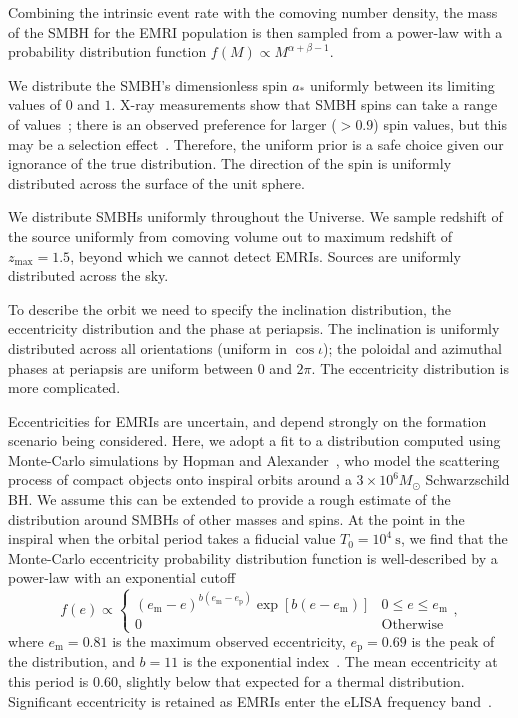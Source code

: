 \documentclass[aps,prd,amsfonts,amssymb,amsmath,nofootinbib,showpacs,superscriptaddress,twocolumn,floatfix]{revtex4-1}
\newcommand{\sub}[1]{\ensuremath{_\mathrm{#1}}}
\begin{document}
Combining the intrinsic event rate with the comoving number density, the mass of the SMBH for the EMRI population is then sampled from a power-law with a probability distribution function $f(M) \propto M^{\alpha+\beta-1}$.

We distribute the SMBH's dimensionless spin $a_\ast$ uniformly between its limiting values of $0$ and $1$. X-ray measurements show that SMBH spins can take a range of values~\cite{Reynolds2013a,Patrick2012,Walton2013,BerryThesis2013}; there is an observed preference for larger ($> 0.9$) spin values, but this may be a selection effect~\cite{Brenneman2011}. Therefore, the uniform prior is a safe choice given our ignorance of the true distribution. The direction of the spin is uniformly distributed across the surface of the unit sphere.

We distribute SMBHs uniformly throughout the Universe. We sample redshift of the source uniformly from comoving volume out to maximum redshift of $z\sub{max} = 1.5$, beyond which we cannot detect EMRIs. Sources are uniformly distributed across the sky. 

To describe the orbit we need to specify the inclination distribution, the eccentricity distribution and the phase at periapsis. The inclination is uniformly distributed across all orientations (uniform in $\cos \iota$); the poloidal and azimuthal phases at periapsis are uniform between $0$ and $2\pi$. The eccentricity distribution is more complicated.

Eccentricities for EMRIs are uncertain, and depend strongly on the formation scenario being considered. Here, we adopt a fit to a distribution computed using Monte-Carlo simulations by Hopman and Alexander~\cite{Hopman2005}, who model the scattering process of compact objects onto inspiral orbits around a $3 \times 10^6 M_\odot$ Schwarzschild BH. We assume this can be extended to provide a rough estimate of the distribution around SMBHs of other masses and spins. At the point in the inspiral when the orbital period takes a fiducial value $T_0 = 10^4~\mathrm{s}$, we find that the Monte-Carlo eccentricity probability distribution function is well-described by a power-law with an exponential cutoff
\begin{equation}
\label{eq:EMRI-e-distribution}
f(e) \propto 
	\begin{cases}
		\left(e\sub{m}-e\right)^{b(e\sub{m}-e\sub{p})} \exp\left[b(e-e\sub{m})\right] & 0 \leq e \leq e\sub{m}\\
		0 & \mathrm{Otherwise}
	\end{cases},
\end{equation}
where $e\sub{m} = 0.81$ is the maximum observed eccentricity, $e\sub{p} = 0.69$ is the peak of the distribution, and $b=11$ is the exponential index~\cite{ColeThesis2015}. The mean eccentricity at this period is $0.60$, slightly below that expected for a thermal distribution. Significant eccentricity is retained as EMRIs enter the eLISA frequency band~\cite{Merritt2015c}. 
\end{document}
